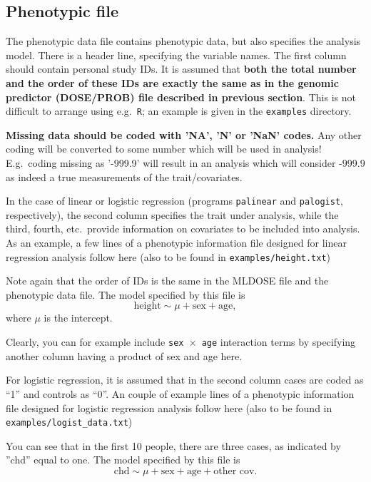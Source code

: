 \documentclass[12pt,a4paper]{article}
\begin{document}
\subsection{Phenotypic file}
\label{ssec:phenoin}

The phenotypic data file contains phenotypic data, but also specifies
the analysis model. There is a header line, specifying the variable
names.  The first column should contain personal study IDs. It is
assumed that \textbf{both the total number and the order of these IDs
  are exactly the same as in the genomic predictor (DOSE/PROB) file
  described in previous section}. This is not difficult to arrange
using e.g.~\texttt{R}; an example is given in the \texttt{examples}
directory.

\textbf{Missing data should be coded with 'NA', 'N' or 'NaN' codes.} Any
other coding will be converted to some number which will be used in
analysis! E.g.~coding missing as '-999.9' will result in an analysis which
will consider -999.9 as indeed a true measurements of the trait/covariates.

In the case of linear or logistic regression (programs
\texttt{palinear} and \texttt{palogist}, respectively), the second
column specifies the trait under analysis, while the third, fourth,
etc.~provide information on covariates to be included into analysis.
As an example, a few lines of a phenotypic information file designed
for linear regression analysis follow here (also to be found in
\texttt{examples/height.txt})


Note again that the order of IDs is the same in the MLDOSE file
and the phenotypic data file. The model specified by this file is
\begin{equation*}
\textrm{height} \sim \mu + \textrm{sex} + \textrm{age},
\end{equation*}
where $\mu$ is the intercept.

Clearly, you can for example include \texttt{sex $\times$ age} interaction terms by
specifying another column having a product of sex and age here.

For logistic regression, it is assumed that in the second column cases are
coded as ``1'' and controls as ``0''. An couple of example lines of a phenotypic
information file designed for logistic regression analysis follow here (also
to be found in \texttt{examples/logist\_data.txt})



You can see that in the first 10 people, there are three cases, as indicated
by ''chd'' equal to one. The model specified by this file
is
\begin{equation*}
\textrm{chd} \sim \mu + \textrm{sex} + \textrm{age} +
\textrm{other cov}.
\end{equation*}
\end{document}

